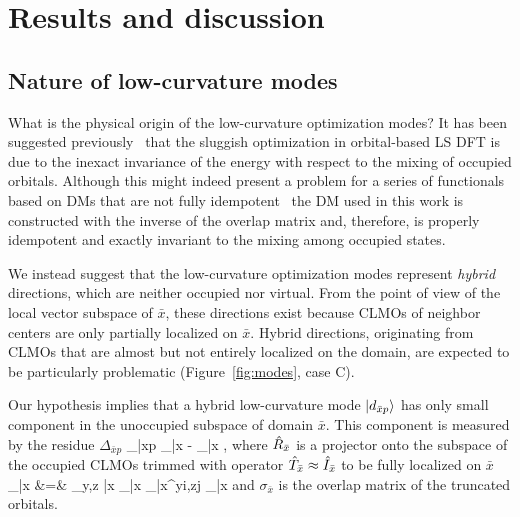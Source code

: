\documentclass[10pt,amsmath,twocolumn,aps,prl,superscriptaddress,floatfix]{revtex4-1}
\begin{document}
\section{Results and discussion}

\subsection{Nature of low-curvature modes} \label{marker:nature} 

What is the physical origin of the low-curvature optimization modes? 
It has been suggested previously~\cite{goedecker1999linear} that the sluggish optimization in orbital-based LS DFT is due to the inexact invariance of the energy with respect to the mixing of occupied orbitals. 
Although this might indeed present a problem for a series of functionals based on DMs that are not fully idempotent~\cite{mauri1993orbital,kim1995total,ordejon1995linear} the DM used in this work is constructed with the inverse of the overlap matrix and, therefore, is properly idempotent and exactly invariant to the mixing among occupied states. 

We instead suggest that the low-curvature optimization modes represent \emph{hybrid} directions, which are neither occupied nor virtual. From the point of view of the local vector subspace of $\bar{x}$, these directions exist because CLMOs of neighbor centers are only partially localized on $\bar{x}$. 
Hybrid directions, originating from CLMOs that are almost but not entirely localized on the domain, are expected to be particularly problematic (Figure~\ref{fig:modes}, case C). 


%
Our hypothesis implies that a hybrid low-curvature mode $\vert d_{\bar{x}p} \rangle$ has only small component in the unoccupied subspace of domain $\bar{x}$. 
This component is measured by the residue $\Delta_{\bar{x}p}$ 
\bea
\label{eq:residue}
\Delta_{\bar{x}p} \equiv {} _{\bar{x}} - _{\bar{x}} , 
\eea
%
where $\hat{R}_{\bar{x}}$ is a projector onto the subspace of the occupied CLMOs trimmed with operator $\hat{T}_{\bar{x}} \approx \hat{I}_{\bar{x}}$ to be fully localized on $\bar{x}$ 
\bea
{}_{\bar{x}} &=& \sum_{y,z \in \bar{x}} _{\bar{x}}  \sigma_{\bar{x}}^{yi,zj}  _{\bar{x}}
\label{eq:C}
\eea
%
and $\sigma_{\bar{x}}$ is the overlap matrix of the truncated orbitals. 
\end{document}
